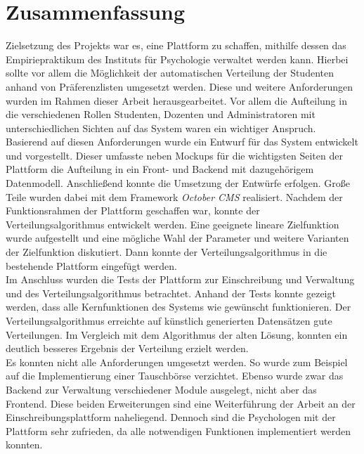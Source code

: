 \chapter{Zusammenfassung}
\label{chapter:summary}
    Zielsetzung des Projekts war es, eine Plattform zu schaffen, mithilfe dessen das Empiriepraktikum des Instituts für Psychologie verwaltet werden kann.
    Hierbei sollte vor allem die Möglichkeit der automatischen Verteilung der Studenten anhand von Präferenzlisten umgesetzt werden.
    Diese und weitere Anforderungen wurden im Rahmen dieser Arbeit herausgearbeitet.
    Vor allem die Aufteilung in die verschiedenen Rollen Studenten, Dozenten und Administratoren mit unterschiedlichen Sichten auf das System waren ein wichtiger Anspruch.
    Basierend auf diesen Anforderungen wurde ein Entwurf für das System entwickelt und vorgestellt.
    Dieser umfasste neben Mockups für die wichtigsten Seiten der Plattform die Aufteilung in ein Front- und Backend mit dazugehörigem Datenmodell.
    Anschließend konnte die Umsetzung der Entwürfe erfolgen.
    Große Teile wurden dabei mit dem Framework \textit{October CMS} realisiert.
    Nachdem der Funktionsrahmen der Plattform geschaffen war, konnte der Verteilungsalgorithmus entwickelt werden.
    Eine geeignete lineare Zielfunktion wurde aufgestellt und eine mögliche Wahl der Parameter und weitere Varianten der Zielfunktion diskutiert.
    Dann konnte der Verteilungsalgorithmus in die bestehende Plattform eingefügt werden.\\
    
    Im Anschluss wurden die Tests der Plattform zur Einschreibung und Verwaltung und des Verteilungsalgorithmus betrachtet.
    Anhand der Tests konnte gezeigt werden, dass alle Kernfunktionen des Systems wie gewünscht funktionieren.
    Der Verteilungsalgorithmus erreichte auf künstlich generierten Datensätzen gute Verteilungen.
    Im Vergleich mit dem Algorithmus der alten Lösung, konnten ein deutlich besseres Ergebnis der Verteilung erzielt werden.\\
    
    Es konnten nicht alle Anforderungen umgesetzt werden.
    So wurde zum Beispiel auf die Implementierung einer Tauschbörse verzichtet.
    Ebenso wurde zwar das Backend zur Verwaltung verschiedener Module ausgelegt, nicht aber das Frontend.
    Diese beiden Erweiterungen sind eine Weiterführung der Arbeit an der Einschreibungsplattform naheliegend.
    Dennoch sind die Psychologen mit der Plattform sehr zufrieden, da alle notwendigen Funktionen implementiert werden konnten. \\
    
    
    




        
    
